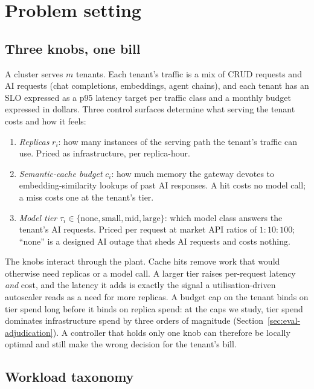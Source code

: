 \section{Problem setting}
\label{sec:problem}

\subsection{Three knobs, one bill}

A cluster serves $m$ tenants. Each tenant's traffic is a mix of CRUD
requests and AI requests (chat completions, embeddings, agent chains), and
each tenant has an SLO expressed as a p95 latency target per traffic
class and a monthly budget expressed in dollars. Three control surfaces
determine what serving the tenant costs and how it feels:

\begin{enumerate}
  \item \emph{Replicas} $r_i$: how many instances of the serving path the
        tenant's traffic can use. Priced as infrastructure, per
        replica-hour.
  \item \emph{Semantic-cache budget} $c_i$: how much memory the gateway
        devotes to embedding-similarity lookups of past AI responses. A
        hit costs no model call; a miss costs one at the tenant's tier.
  \item \emph{Model tier} $\tau_i \in \{\text{none}, \text{small},
        \text{mid}, \text{large}\}$: which model class answers the tenant's
        AI requests. Priced per request at market API ratios of
        $1{:}10{:}100$; ``none'' is a designed AI outage that sheds AI
        requests and costs nothing.
\end{enumerate}

The knobs interact through the plant. Cache hits remove work that would
otherwise need replicas or a model call. A larger tier raises per-request
latency \emph{and} cost, and the latency it adds is exactly the signal a
utilisation-driven autoscaler reads as a need for more replicas. A budget
cap on the tenant binds on tier spend long before it binds on replica
spend: at the caps we study, tier spend dominates infrastructure spend by
three orders of magnitude (Section~\ref{sec:eval-adjudication}). A
controller that holds only one knob can therefore be locally optimal and
still make the wrong decision for the tenant's bill.

\subsection{Workload taxonomy}
\label{sec:taxonomy}

